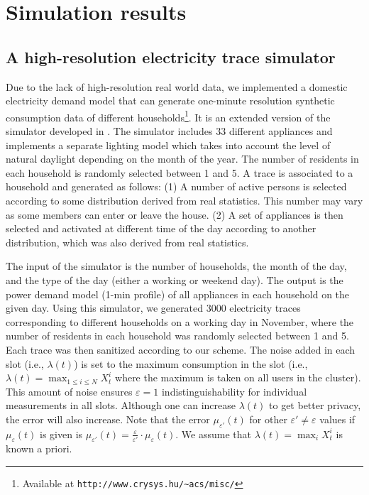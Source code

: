 \documentclass[11pt,a4paper]{article}
\theoremstyle{plain}
\theoremstyle{plain}
\theoremstyle{plain}
\theoremstyle{plain}
\theoremstyle{nonumberplain} \theoremseparator{}
\begin{document}
\section{Simulation results}

\subsection{A high-resolution electricity trace simulator}



Due to the lack of high-resolution real world data, we implemented a domestic electricity demand model \cite{richardson10} that can generate one-minute resolution synthetic consumption data of different households\footnote{Available at \texttt{http://www.crysys.hu/\textasciitilde acs/misc/}}. It is an extended version of the simulator developed in \cite{richardson10}.  
The simulator includes 33 different appliances and implements a separate lighting model which takes into account the level of natural daylight depending on the month of the year. The number of residents in each household is randomly selected between 1 and 5. A trace is associated to a household and generated as follows: 
(1) A number of active persons is selected according to some distribution derived from real statistics. This number may vary as some members
can enter or leave the house. (2) A set of appliances is then selected and activated at different time of the day according to  another distribution,
which was also derived from real statistics. 
 
The input of the simulator is the number of households, the month of the day, and the type of the day (either a working or weekend day). The output is the power demand model (1-min profile) of all appliances in each household on the given day. Using this simulator, we generated 3000 electricity traces corresponding to different households on a working day in November, where the number of residents in each 
household was randomly selected between 1 and 5. Each trace was then sanitized according to our scheme.
The noise added in each slot (i.e., $\lambda(t)$) is set to the maximum consumption in the slot (i.e., $\lambda(t) = \max_{1\leq i \leq N}X_{t}^{i}$ where the maximum is taken on all users in the cluster). This amount of noise ensures $\varepsilon=1$ indistinguishability for individual measurements in all slots.
Although one can increase $\lambda(t)$ to get better privacy, the error will also increase. Note that the error $\mu_{\varepsilon'}(t)$ for other $\varepsilon' \neq \varepsilon$ values if $\mu_{\varepsilon}(t)$ is given is $\mu_{\varepsilon'}(t) = \frac{\varepsilon}{\varepsilon'} \cdot \mu_{\varepsilon}(t)$. We assume that $\lambda(t) = \max_{i}X_{t}^{i}$ is known a priori.    
\end{document}
